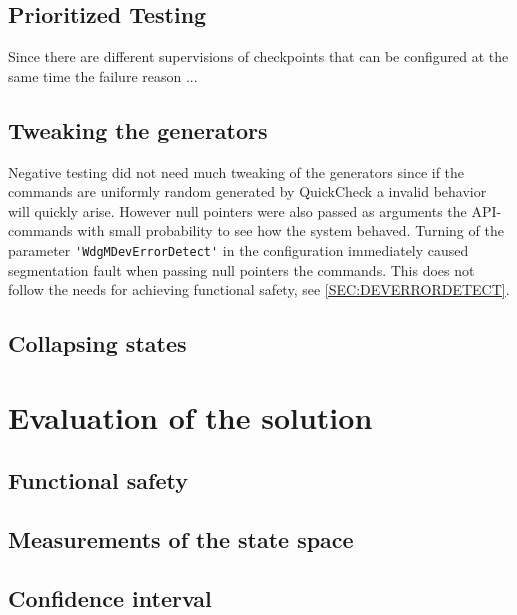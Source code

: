 \subsection{Prioritized Testing}
Since there are different supervisions of checkpoints that can be
configured at the same time the failure reason ...

\subsection{Tweaking the generators}
Negative testing did not need much tweaking of the generators since if
the commands are uniformly random generated by QuickCheck a invalid
behavior will quickly arise. However null pointers were also
passed as arguments the API-commands with small probability to see how
the system behaved. Turning of the parameter
\lstinline!'WdgMDevErrorDetect'! in the configuration immediately caused segmentation
fault when passing null pointers the commands. This does not follow
the needs for achieving functional safety, see \ref{SEC:DEVERRORDETECT}.


\subsection{Collapsing states}

\section{Evaluation of the solution}
\subsection{Functional safety}

\subsection{Measurements of the state space}

\subsection{Confidence interval}


